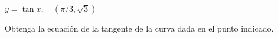 \item $y = \tan x, \quad (\pi/3, \sqrt{3})$
\par
Obtenga la ecuación de la tangente de la curva dada en el punto indicado.
